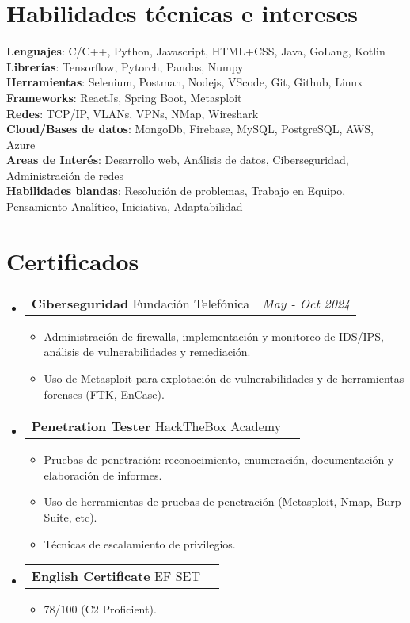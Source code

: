\documentclass[a4paper,11pt]{article}
\makeatletter
\newcommand{\resumePOR}[3]{
\vspace{0.5mm}\item
    \begin{tabular*}{0.97\textwidth}[t]{l@{\extracolsep{\fill}}r}
        \textbf{#1}\hspace{0.3mm}#2 & \textit{\small{#3}} 
    \end{tabular*}
    \vspace{-2mm}
}
\newcommand{\resumeSubHeadingListStart}{\begin{itemize}[leftmargin=*,labelsep=0mm]}
\newcommand{\resumeItemListStart}{\begin{justify}\begin{itemize}[leftmargin=3ex, rightmargin=2ex, noitemsep,labelsep=1.2mm,itemsep=0mm]\small}
\newcommand{\resumeSubHeadingListEnd}{\end{itemize}\vspace{2mm}}
\newcommand{\resumeItemListEnd}{\end{itemize}\end{justify}\vspace{-2mm}}
\makeatother
\begin{document}
\section{\textbf{Habilidades técnicas e intereses}}
 \begin{itemize}[leftmargin=0.05in, label={}]
    \small{\item{
     \textbf{Lenguajes}{: C/C++, Python, Javascript, HTML+CSS, Java, GoLang, Kotlin } \\
     \textbf{Librerías}{: Tensorflow, Pytorch, Pandas, Numpy } \\
     \textbf{Herramientas}{: Selenium, Postman, Nodejs, VScode, Git, Github, Linux } \\ 
     \textbf{Frameworks}{: ReactJs, Spring Boot, Metasploit } \\
     \textbf{Redes}{: TCP/IP, VLANs, VPNs, NMap, Wireshark } \\
     \textbf{Cloud/Bases de datos}{: MongoDb, Firebase, MySQL, PostgreSQL, AWS, Azure } \\  
     \textbf{Areas de Interés}{: Desarrollo web, Análisis de datos, Ciberseguridad, Administración de redes} \\
     \textbf{Habilidades blandas}{: Resolución de problemas, Trabajo en Equipo, Pensamiento Analítico, Iniciativa, Adaptabilidad} \\
    }}
 \end{itemize}
 \vspace{-16pt}



\section{\textbf{Certificados}}
\vspace{-0.4mm}
\resumeSubHeadingListStart
\resumePOR{Ciberseguridad }
    {Fundación Telefónica} 
    {May - Oct 2024} 
    \resumeItemListStart
    \item {Administración de firewalls, implementación y monitoreo de IDS/IPS, análisis de vulnerabilidades y remediación.}
    \item {Uso de Metasploit para explotación de vulnerabilidades y de herramientas forenses (FTK, EnCase).}
    \resumeItemListEnd

\resumeSubHeadingListEnd
\vspace{-10mm}

\resumeSubHeadingListStart
\resumePOR{Penetration Tester } 
    {HackTheBox Academy}
    {} 
    \resumeItemListStart
    \item {Pruebas de penetración: reconocimiento, enumeración, documentación y elaboración de informes.}
    \item {Uso de herramientas de pruebas de penetración (Metasploit, Nmap, Burp Suite, etc).}
    \item {Técnicas de escalamiento de privilegios.}
    \resumeItemListEnd

\resumeSubHeadingListEnd
\vspace{-10mm}

\resumeSubHeadingListStart
\resumePOR{English Certificate } 
    {EF SET} 
    {} 
    \resumeItemListStart
    \item {78/100 (C2 Proficient).}
    \resumeItemListEnd

\resumeSubHeadingListEnd
\vspace{-10mm}
\end{document}
